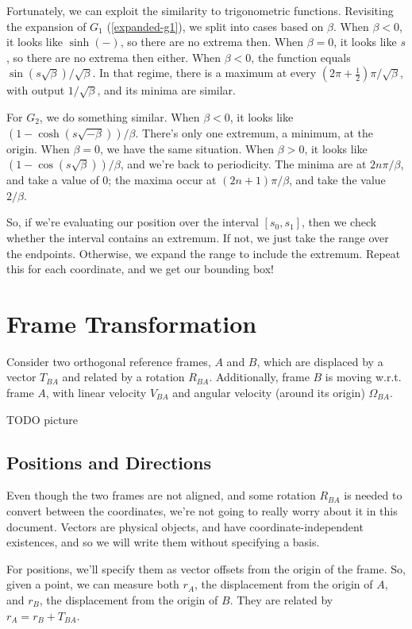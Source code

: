 \documentclass{article}
\numberwithin{equation}{subsection}
\begin{document}
Fortunately, we can exploit the similarity to trigonometric functions. Revisiting the expansion of $G_1$ (\ref{expanded-g1}), we split into cases based on $\beta$. When $\beta < 0$, it looks like $\sinh(-)$, so there are no extrema then. When $\beta = 0$, it looks like $s$, so there are no extrema then either. When $\beta < 0$, the function equals $\sin(s \sqrt \beta) / \sqrt \beta$. In that regime, there is a maximum at every $\left( 2\pi + \frac{1}{2} \right) \pi / \sqrt \beta$, with output $1/\sqrt \beta$, and its minima are similar.

For $G_2$, we do something similar. When $\beta < 0$, it looks like $(1 - \cosh(s \sqrt{-\beta})) / \beta$. There's only one extremum, a minimum, at the origin. When $\beta = 0$, we have the same situation. When $\beta > 0$, it looks like $(1 - \cos(s \sqrt \beta)) / \beta$, and we're back to periodicity. The minima are at $2n\pi / \beta$, and take a value of $0$; the maxima occur at $(2n+1)\pi/\beta$, and take the value $2/\beta$.

So, if we're evaluating our position over the interval $[s_0, s_1]$, then we check whether the interval contains an extremum. If not, we just take the range over the endpoints. Otherwise, we expand the range to include the extremum. Repeat this for each coordinate, and we get our bounding box!


\section{Frame Transformation}
Consider two orthogonal reference frames, $A$ and $B$, which are displaced by a vector $T_{BA}$ and related by a rotation $R_{BA}$. Additionally, frame $B$ is moving w.r.t. frame $A$, with linear velocity $V_{BA}$ and angular velocity (around its origin) $\Omega_{BA}$.

TODO picture

\subsection{Positions and Directions}

Even though the two frames are not aligned, and some rotation $R_{BA}$ is needed to convert between the coordinates, we're not going to really worry about it in this document. Vectors are physical objects, and have coordinate-independent existences, and so we will write them without specifying a basis.

For positions, we'll specify them as vector offsets from the origin of the frame. So, given a point, we can measure both $r_A$, the displacement from the origin of $A$, and $r_B$, the displacement from the origin of $B$. They are related by $r_A = r_B + T_{BA}$.
\end{document}

